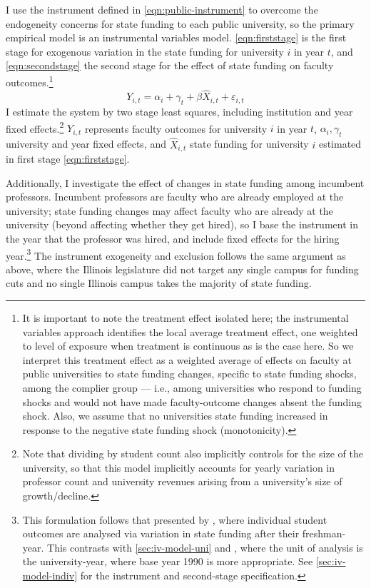 I use the instrument defined in \autoref{eqn:public-instrument} to overcome the endogeneity concerns for state funding to each public university, so the primary empirical model is an instrumental variables model.
\autoref{eqn:firststage} is the first stage for exogenous variation in the state funding for university $i$ in year $t$, and \autoref{eqn:secondstage} the second stage for the effect of state funding on faculty outcomes.\footnote{
    It is important to note the treatment effect isolated here; the instrumental variables approach identifies the local average treatment effect, one weighted to level of exposure when treatment is continuous as is the case here.
    So we interpret this treatment effect as a weighted average of effects on faculty at public universities to state funding changes, specific to state funding shocks, among the complier group --- i.e., among universities who respond to funding shocks and would not have made faculty-outcome changes absent the funding shock.
    Also, we assume that no universities state funding increased in response to the negative state funding shock (monotonicity).
}
\begin{equation}
    \label{eqn:secondstage}
    Y_{i,t} = \alpha_i + \gamma_t + \beta \widehat X_{i,t} + \varepsilon_{i,t}
\end{equation}
I estimate the system by two stage least squares, including institution and year fixed effects.\footnote{
    Note that dividing by student count also implicitly controls for the size of the university, so that this model implicitly accounts for yearly variation in professor count and university revenues arising from a university's size of growth/decline.
}
$Y_{i,t}$ represents faculty outcomes for university $i$ in year $t$, $\alpha_i, \gamma_t$ university and year fixed effects, and $\widehat X_{i,t}$ state funding for university $i$ estimated in first stage \eqref{eqn:firststage}.

Additionally, I investigate the effect of changes in state funding among incumbent professors.
Incumbent professors are faculty who are already employed at the university; state funding changes may affect faculty who are already at the university (beyond affecting whether they get hired), so I base the instrument in the year that the professor was hired, and include fixed effects for the hiring year.\footnote{
    This formulation follows that presented by \cite{NBERw27885}, where individual student outcomes are analysed via variation in state funding after their freshman-year.
    This contrasts with \autoref{sec:iv-model-uni} and \cite{NBERw23736}, where the unit of analysis is the university-year, where base year 1990 is more appropriate.
    See \autoref{sec:iv-model-indiv} for the instrument and second-stage specification.
}
The instrument exogeneity and exclusion follows the same argument as above, where the Illinois legislature did not target any single campus for funding cuts and no single Illinois campus takes the majority of state funding.

